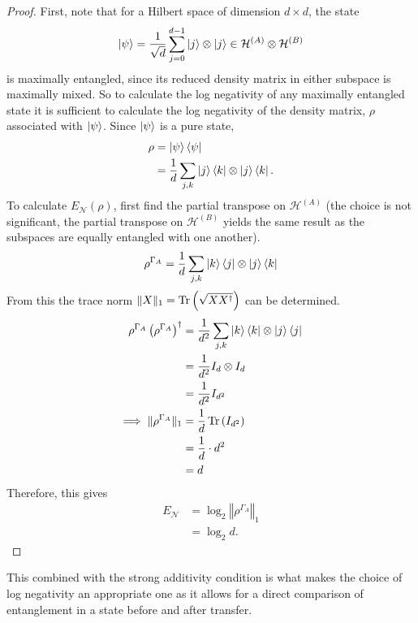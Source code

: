 \begin{proof}
    First, note that for a Hilbert space of dimension $d\times d$, the state
    \begin{equation}
        \ket{\psi} = \frac{1}{\sqrt{d}}\sum_{j=0}^{d-1}\ket{j}\otimes\ket{j}\in \mathcal{H}^{(A)} \otimes \mathcal{H}^{(B)}
    \end{equation}
    is maximally entangled, since its reduced density matrix in either subspace is maximally mixed.
    So to calculate the log negativity of any maximally entangled state it is sufficient to calculate the log negativity of the density matrix, $\rho$ associated with $\ket{\psi}$.
    Since $\ket{\psi}$ is a pure state,
    \begin{align}
        \rho &= \ket{\psi}\bra{\psi}\\
        &=\frac{1}{d} \sum_{j,k}\ket{j}\bra{k}\otimes\ket{j}\bra{k}.
    \end{align}
    To calculate $E_{\mathcal{N}}(\rho)$, first find the partial transpose on $\mathcal{H}^{(A)}$ (the choice is not significant, the partial transpose on $\mathcal{H}^{(B)}$ yields the same result as the subspaces are equally entangled with one another).
    \begin{align}
        \rho^{\Gamma_A} =\frac{1}{d} \sum_{j,k}\ket{k}\bra{j}\otimes\ket{j}\bra{k}
    \end{align}
    From this the trace norm $\Vert X\Vert_1 = \operatorname{Tr}\left(\sqrt{XX^{\dagger}}\right)$ can be determined.
    \begin{align}
        \rho^{\Gamma_A}\left(\rho^{\Gamma_A}\right)^{\dagger} &= \frac{1}{d^2} \sum_{j,k}\ket{k}\bra{k}\otimes\ket{j}\bra{j}\\
        &=\frac{1}{d^2}I_d\otimes I_d\\
        &=\frac{1}{d^2}I_{d^2}\\
        \implies \Vert\rho^{\Gamma_A}\Vert_1 &= \frac{1}{d}\operatorname{Tr}{\left(I_{d^2}\right)}\\
        &= \frac{1}{d}\cdot d^2\\
        &= d
    \end{align}
    Therefore, this gives
    \begin{align}
        E_{\mathcal{N}} &= \log_2\left\Vert \rho^{\Gamma_A}\right\Vert_1\\
        &= \log_2d.
    \end{align}
\end{proof}
This combined with the strong additivity condition is what makes the choice of log negativity an appropriate one as it allows for a direct comparison of entanglement in a state before and after transfer.
